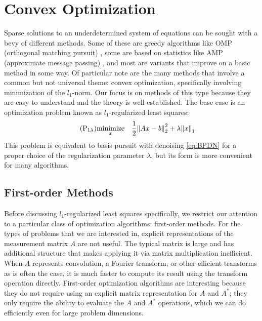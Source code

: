 \section{Convex Optimization}
\label{convex_optimization}
Sparse solutions to an underdetermined system of equations can be sought with a bevy of different methods. Some of these are greedy algorithms like OMP (orthogonal matching pursuit) \autocite{TG07}, some are based on statistics like AMP (approximate message passing) \autocite{DMM09}, and most are variants that improve on a basic method in some way. Of particular note are the many methods that involve a common but not universal theme: convex optimization, specifically involving minimization of the $l_1$-norm. Our focus is on methods of this type because they are easy to understand and the theory is well-established. The base case is an optimization problem known as $l_1$-regularized least squares:
\begin{equation*}\tag{$\text{P}_{\text{1}\lambda}$} \label{eq:l1rls}
 \underset{x}{\mathrm{minimize}} \quad \frac{1}{2}\norm{2}{Ax - b}^2 + \lambda\norm{1}{x}.
\end{equation*}
This problem is equivalent to basis pursuit with denoising \eqref{eq:BPDN} for a proper choice of the regularization parameter $\lambda$, but its form is more convenient for many algorithms.

\subsection{First-order Methods}
Before discussing $l_1$-regularized least squares specifically, we restrict our attention to a particular class of optimization algorithms: first-order methods. For the types of problems that we are interested in, explicit representations of the measurement matrix $A$ are not useful. The typical matrix is large and has additional structure that makes applying it via matrix multiplication inefficient. When $A$ represents convolution, a Fourier transform, or other efficient transforms as is often the case, it is much faster to compute its result using the transform operation directly. First-order optimization algorithms are interesting because they do not require using an explicit matrix representation for $A$ and $A^*$; they only require the ability to evaluate the $A$ and $A^*$ operations, which we can do efficiently even for large problem dimensions.


